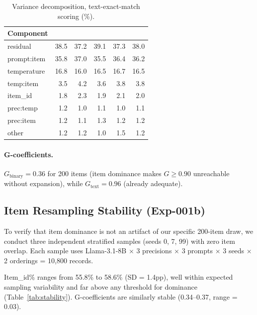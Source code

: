 \documentclass[11pt,twocolumn]{article}
\begin{document}
\begin{table}[t]
\centering
\caption{Variance decomposition, text-exact-match scoring (\%).}
\label{tab:var_text}
\small
\begin{tabular}{lRRRRR}
\toprule
Component &  &  &  &  &  \\
\midrule
residual & 38.5 & 37.2 & 39.1 & 37.3 & 38.0 \\
prompt:item & 35.8 & 37.0 & 35.5 & 36.4 & 36.2 \\
temperature & 16.8 & 16.0 & 16.5 & 16.7 & 16.5 \\
temp:item & 3.5 & 4.2 & 3.6 & 3.8 & 3.8 \\
item\_id & 1.8 & 2.3 & 1.9 & 2.1 & 2.0 \\
prec:temp & 1.2 & 1.0 & 1.1 & 1.0 & 1.1 \\
prec:item & 1.2 & 1.1 & 1.3 & 1.2 & 1.2 \\
other & 1.2 & 1.2 & 1.0 & 1.5 & 1.2 \\
\bottomrule
\end{tabular}
\end{table}

\paragraph{G-coefficients.}
$G_{\text{binary}} = 0.36$ for 200 items (item dominance makes $G \geq 0.90$ unreachable without expansion), while $G_{\text{text}} = 0.96$ (already adequate).

\subsection{Item Resampling Stability (Exp-001b)}
\label{sec:exp001b}

To verify that item dominance is not an artifact of our specific 200-item draw, we conduct three independent stratified samples (seeds 0, 7, 99) with zero item overlap.
Each sample uses Llama-3.1-8B $\times$ 3 precisions $\times$ 3 prompts $\times$ 3 seeds $\times$ 2 orderings = 10{,}800 records.

Item\_id\% ranges from 55.8\% to 58.6\% (SD = 1.4pp), well within expected sampling variability and far above any threshold for dominance (Table~\ref{tab:stability}).
G-coefficients are similarly stable (0.34--0.37, range = 0.03).
\end{document}
